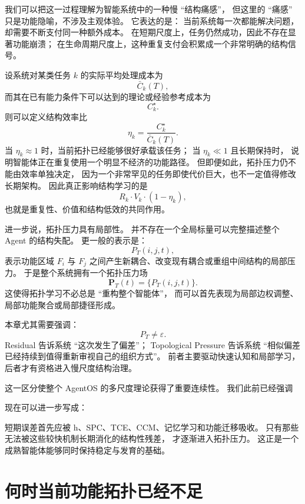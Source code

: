 我们可以把这一过程理解为智能系统中的一种慢 ``结构痛感''，
但这里的 ``痛感'' 只是功能隐喻，不涉及主观体验。
它表达的是：
当前系统每一次都能解决问题，
却需要不断支付同一种额外成本。
在短期尺度上，任务仍然成功，因此不存在显著功能崩溃；
在生命周期尺度上，这种重复支付会积累成一个非常明确的结构信号。

设系统对某类任务 $k$ 的实际平均处理成本为
\[
\bar C_k(T),
\]
而其在已有能力条件下可以达到的理论或经验参考成本为
\[
C_k^\star.
\]
则可以定义结构效率比
\[
\eta_k
=
\frac{C_k^\star}{\bar C_k(T)}.
\]
当 $\eta_k\approx 1$ 时，当前拓扑已经能够很好承载该任务；
当 $\eta_k\ll 1$ 且长期保持时，
说明智能体正在重复使用一个明显不经济的功能路径。
但即便如此，拓扑压力仍不能由效率单独决定，
因为一个非常罕见的任务即使代价巨大，也不一定值得修改长期架构。
因此真正影响结构学习的是
\[
R_k \cdot V_k \cdot (1-\eta_k),
\]
也就是重复性、价值和结构低效的共同作用。

进一步说，拓扑压力具有局部性。
并不存在一个全局标量可以完整描述整个 Agent 的结构失配。
更一般的表示是：
\[
P_T(i,j,t),
\]
表示功能区域 $F_i$ 与 $F_j$ 之间产生新耦合、改变现有耦合或重组中间结构的局部压力。
于是整个系统拥有一个拓扑压力场
\[
\mathbf P_T(t)
=
\{P_T(i,j,t)\}.
\]
这使得拓扑学习不必总是 ``重构整个智能体''，
而可以首先表现为局部边权调整、局部功能聚合或局部捷径形成。

本章尤其需要强调：
\[
\boxed{
P_T
\neq
\varepsilon.
}
\]
Residual 告诉系统 ``这次发生了偏差''；
Topological Pressure 告诉系统
``相似偏差已经持续到值得重新审视自己的组织方式''。
前者主要驱动快速认知和局部学习，
后者才有资格进入慢尺度结构治理。

这一区分使整个 AgentOS 的多尺度理论获得了重要连续性。
我们此前已经强调
\begin{statementbox}
\centering
{}
\end{statementbox}
现在可以进一步写成：
\begin{statementbox}
\centering
{}
\end{statementbox}
短期误差首先应被 h、SPC、TCE、CCM、记忆学习和功能迁移吸收。
只有那些无法被这些较快机制长期消化的结构性残差，
才逐渐进入拓扑压力。
这正是一个成熟智能体能够同时保持稳定与发育的基础。

\section{何时当前功能拓扑已经不足}


